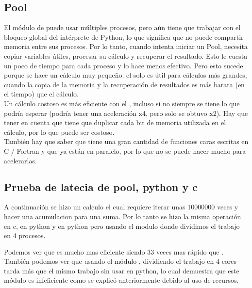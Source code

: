 \subsection{Pool}
    El módulo de  puede usar múltiples procesos, pero aún
    tiene que trabajar con el bloqueo global del intérprete de Python, lo que
    significa que no puede compartir memoria entre sus procesos. Por lo tanto,
    cuando intenta iniciar un Pool, necesita copiar variables útiles, procesar
    su cálculo y recuperar el resultado. Esto le cuesta un poco de tiempo para
    cada proceso y lo hace menos efectivo. Pero esto sucede porque se hace
    un cálculo muy pequeño: el  solo es útil para cálculos
    más grandes, cuando la copia de la memoria y la recuperación de resultados
    es más barata (en el tiempo) que el cálculo.\\

    Un cálculo costoso es más eficiente con el , incluso
    si no siempre se tiene lo que podría esperar (podría tener una aceleración x4,
    pero solo se obtuvo x2). Hay que tener en cuenta que  tiene que
    duplicar cada bit de memoria utilizada en el cálculo, por lo que puede ser
    costoso.\\
    También hay que saber que  tiene una gran cantidad de funciones
    caras escritas en C / Fortran y que ya están en paralelo, por lo que no
    se puede hacer mucho para acelerarlas.
\subsection{Prueba de latecia de pool, python y c}
    A continuación se hizo un calculo el cual requiere iterar unas 10000000 veces
    y hacer una acumulacion para una suma. Por lo tanto se hizo la misma operación
    en c, en python y en python pero usando el modulo  donde dividimos el
    trabajo en 4 procesos.
    \def\text{tiempos de la pruebas en segundos}
    \def\path{test_pool.png}
    \def\scale{.6}
    
    Podemos ver que  es mucho mas eficiente siendo 33 veces mas rápido que
    . También podemos ver que usando el módulo , dividiendo
    el trabajo en 4 cores tarda más que el mismo trabajo sin usar 
    en python, lo cual demuestra que este módulo es infeficiente como se explicó
    anteriormente debido al uso de recursos.